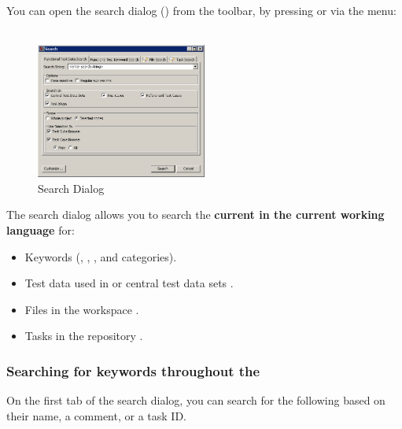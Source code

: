 You can open the search dialog () from the toolbar, by pressing  or via the menu:\\
\\

\begin{figure}[h]
\begin{center}
\includegraphics[width=0.50\textwidth]{Tasks/Searching/PS/SearchDialog}
\caption{Search Dialog}
\label{SearchDialog}
\end{center}
\end{figure}

The search dialog allows you to search the \textbf{current \gdproject{} in the  current working language} for:

\begin{itemize}
\item Keywords  (\gdcases{}, \gdsteps{}, \gdsuites{}, \gdjobs{} and categories).
\item Test data used in \gdcases{} or central test data sets .
\item Files in the workspace .
\item Tasks in the repository .
\end{itemize}


\subsubsection{Searching for keywords throughout the \gdproject{}}
\label{TasksSearchKeywords}

On the first tab of the search dialog, you can search for the following based on their name, a comment, or a task ID. 

